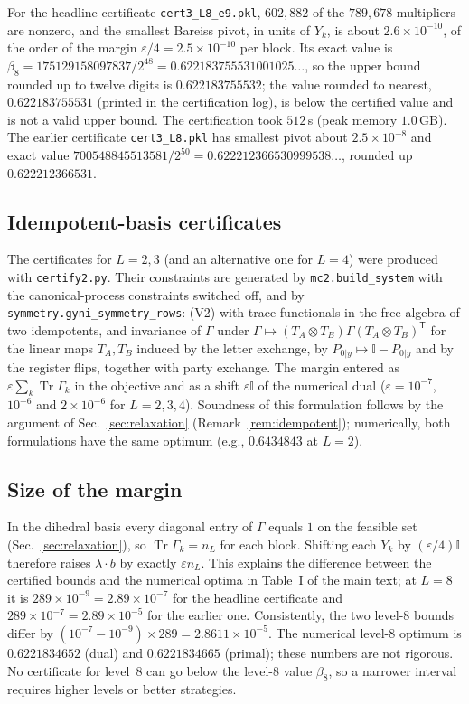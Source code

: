 \documentclass[aps,pra,onecolumn,notitlepage,superscriptaddress,longbibliography,nofootinbib,11pt]{revtex4-2}
\theoremstyle{remark}
\newcommand{\Tr}{\operatorname{Tr}}
\newcommand{\one}{\mathbb{I}}
\newcommand{\tp}{\mathsf{T}}
\newcommand{\file}[1]{\texttt{#1}}
\begin{document}
For the headline certificate \file{cert3\_L8\_e9.pkl}, $602{,}882$ of the $789{,}678$ multipliers are nonzero, and the smallest Bareiss pivot, in units of $Y_k$, is about $2.6\times10^{-10}$, of the order of the margin $\varepsilon/4=2.5\times10^{-10}$ per block. Its exact value is $\beta_8=175129158097837/2^{48}=0.622183755531001025\ldots$, so the upper bound rounded up to twelve digits is $0.622183755532$; the value rounded to nearest, $0.622183755531$ (printed in the certification log), is below the certified value and is not a valid upper bound. The certification took $512$\,s (peak memory $1.0$\,GB). The earlier certificate \file{cert3\_L8.pkl} has smallest pivot about $2.5\times10^{-8}$ and exact value $700548845513581/2^{50}=0.622212366530999538\ldots$, rounded up $0.622212366531$.

\subsection{Idempotent-basis certificates}\label{sec:idempotent}

The certificates for $L=2,3$ (and an alternative one for $L=4$) were produced with \file{certify2.py}. Their constraints are generated by \file{mc2.build\_system} with the canonical-process constraints switched off, and by \file{symmetry.gyni\_symmetry\_rows}: (V2) with trace functionals in the free algebra of two idempotents, and invariance of $\Gamma$ under $\Gamma\mapsto(T_A\otimes T_B)\Gamma(T_A\otimes T_B)^\tp$ for the linear maps $T_A,T_B$ induced by the letter exchange, by $P_{0|y}\mapsto\one-P_{0|y}$ and by the register flips, together with party exchange. The margin entered as $\varepsilon\sum_k\Tr\Gamma_k$ in the objective and as a shift $\varepsilon\one$ of the numerical dual ($\varepsilon=10^{-7}$, $10^{-6}$ and $2\times10^{-6}$ for $L=2,3,4$). Soundness of this formulation follows by the argument of Sec.~\ref{sec:relaxation} (Remark~\ref{rem:idempotent}); numerically, both formulations have the same optimum (e.g., $0.6434843$ at $L=2$).

\subsection{Size of the margin}

In the dihedral basis every diagonal entry of $\Gamma$ equals $1$ on the feasible set (Sec.~\ref{sec:relaxation}), so $\Tr\Gamma_k=n_L$ for each block. Shifting each $Y_k$ by $(\varepsilon/4)\one$ therefore raises $\lambda\cdot b$ by exactly $\varepsilon n_L$. This explains the difference between the certified bounds and the numerical optima in Table~I of the main text; at $L=8$ it is $289\times10^{-9}=2.89\times10^{-7}$ for the headline certificate and $289\times10^{-7}=2.89\times10^{-5}$ for the earlier one. Consistently, the two level-8 bounds differ by $(10^{-7}-10^{-9})\times289=2.8611\times10^{-5}$. The numerical level-8 optimum is $0.6221834652$ (dual) and $0.6221834665$ (primal); these numbers are not rigorous. No certificate for level~8 can go below the level-8 value $\beta_8$, so a narrower interval requires higher levels or better strategies.
\end{document}
